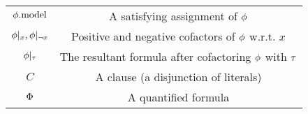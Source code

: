 \begin{table}[t]
\begin{tabular}{c|c}
        $\phi.\mathrm{model}$               & A satisfying assignment of $\phi$                              \\
        $\phi|_{x},\phi|_{\lnot x}$ & Positive and negative cofactors of $\phi$ w.r.t. $x$           \\
        $\phi|_{\tau}$            & The resultant formula after cofactoring $\phi$ with $\tau$      \\
        $C$                         & A clause (a disjunction of literals)                          \\
        $\Phi$                       & A quantified formula                                          \\
    \end{tabular}
\end{table}



